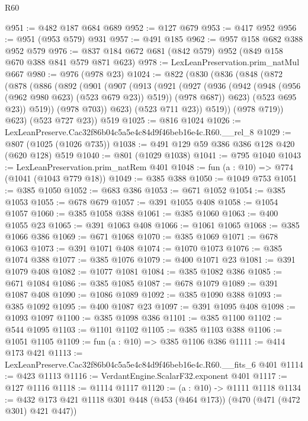 \begin{lexlean}{R60}
\begin{coremodule}
@951 := @482 @187 @684 @689
@952 := @127 @679
@953 := @417 @952
@956 := @951 (@953 @579) @931
@957 := @491 @185
@962 := @957 @158 @682 @388 @952 @579
@976 := @837 @184 @672 @681 (@842 @579) @952 (@849 @158 @670 @388 @841 @579 @871 @623)
@978 := LexLeanPreservation.prim_natMul @667
@980 := @976 (@978 @23)
@1024 := @822
    (@830
      (@836
        (@848
          (@872
            (@878
              (@886
                (@892
                  (@901
                    (@907
                      (@913
                        (@921
                          (@927
                            (@936
                              (@942 (@948 (@956 (@962 @980 @623) (@523 @679 @23)) @519))
                              (@978 @687))
                            @623)
                          (@523 @695 @23))
                        @519))
                    (@978 @703))
                  @623)
                (@523 @711 @23))
              @519))
          (@978 @719))
        @623)
      (@523 @727 @23))
    @519
@1025 := @816 @1024
@1026 := LexLeanPreserve.Cac32f86b04c5a5e4c84d9f46beb16e4c.R60.__rel_8
@1029 := @807 (@1025 (@1026 @735))
@1038 := @491 @129 @59 @386 @386 @128 @420 (@620 @128) @519
@1040 := @801 (@1029 @1038)
@1041 := @795 @1040
@1043 := LexLeanPreservation.prim_natRem @401
@1048 := fun (a : @10) => @774 (@1041 (@1043 @779 @18))
@1049 := @385 @388
@1050 := @1049 @753
@1051 := @385 @1050
@1052 := @683 @386
@1053 := @671 @1052
@1054 := @385 @1053
@1055 := @678 @679
@1057 := @391 @1055 @408
@1058 := @1054 @1057
@1060 := @385 @1058 @388
@1061 := @385 @1060
@1063 := @400 @1055 @23
@1065 := @391 @1063 @408
@1066 := @1061 @1065
@1068 := @385 @1066 @386
@1069 := @671 @1068
@1070 := @385 @1069
@1071 := @678 @1063
@1073 := @391 @1071 @408
@1074 := @1070 @1073
@1076 := @385 @1074 @388
@1077 := @385 @1076
@1079 := @400 @1071 @23
@1081 := @391 @1079 @408
@1082 := @1077 @1081
@1084 := @385 @1082 @386
@1085 := @671 @1084
@1086 := @385 @1085
@1087 := @678 @1079
@1089 := @391 @1087 @408
@1090 := @1086 @1089
@1092 := @385 @1090 @388
@1093 := @385 @1092
@1095 := @400 @1087 @23
@1097 := @391 @1095 @408
@1098 := @1093 @1097
@1100 := @385 @1098 @386
@1101 := @385 @1100
@1102 := @544 @1095
@1103 := @1101 @1102
@1105 := @385 @1103 @388
@1106 := @1051 @1105
@1109 := fun (a : @10) => @385 @1106 @386
@1111 := @414 @173 @421
@1113 := LexLeanPreserve.Cac32f86b04c5a5e4c84d9f46beb16e4c.R60.__fits_6 @401
@1114 := @423 @1113
@1116 := VerdantEngine.ScalarF32.exponent @401
@1117 := @127 @1116
@1118 := @1114 @1117
@1120 := (a : @10) -> @1111 @1118
@1134 := @432 @173 @421 @1118 @301 @448 (@453 (@464 @173)) (@470 (@471 (@472 @301) @421 @447))

\end{coremodule}
\end{lexlean}
